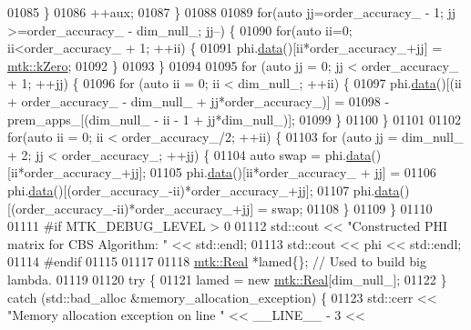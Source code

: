 \begin{DoxyCode}
{{01085       \}
01086       ++aux;
01087     \}
01088 
01089     \textcolor{keywordflow}{for}(\textcolor{keyword}{auto} jj=order\_accuracy\_ - 1; jj >=order\_accuracy\_ - dim\_null\_; jj--) \{
01090       \textcolor{keywordflow}{for}(\textcolor{keyword}{auto} ii=0; ii<order\_accuracy\_ + 1; ++ii) \{
01091         phi.\hyperlink{classmtk_1_1DenseMatrix_a16b3ff56feb2658b9fc7147d1de4d8e7}{data}()[ii*order\_accuracy\_+jj] = \hyperlink{group__c01-roots_ga59a451a5fae30d59649bcda274fea271}{mtk::kZero};
01092       \}
01093     \}
01094 
01095     \textcolor{keywordflow}{for} (\textcolor{keyword}{auto} jj = 0; jj < order\_accuracy\_ + 1; ++jj) \{
01096       \textcolor{keywordflow}{for} (\textcolor{keyword}{auto} ii = 0; ii < dim\_null\_; ++ii) \{
01097         phi.\hyperlink{classmtk_1_1DenseMatrix_a16b3ff56feb2658b9fc7147d1de4d8e7}{data}()[(ii + order\_accuracy\_ - dim\_null\_ + jj*order\_accuracy\_)] =
01098           -prem\_apps\_[(dim\_null\_ - ii - 1 + jj*dim\_null\_)];
01099       \}
01100     \}
01101 
01102     \textcolor{keywordflow}{for}(\textcolor{keyword}{auto} ii = 0; ii < order\_accuracy\_/2; ++ii) \{
01103       \textcolor{keywordflow}{for} (\textcolor{keyword}{auto} jj = dim\_null\_ + 2; jj < order\_accuracy\_; ++jj) \{
01104         \textcolor{keyword}{auto} swap = phi.\hyperlink{classmtk_1_1DenseMatrix_a16b3ff56feb2658b9fc7147d1de4d8e7}{data}()[ii*order\_accuracy\_+jj];
01105         phi.\hyperlink{classmtk_1_1DenseMatrix_a16b3ff56feb2658b9fc7147d1de4d8e7}{data}()[ii*order\_accuracy\_ + jj] =
01106           phi.\hyperlink{classmtk_1_1DenseMatrix_a16b3ff56feb2658b9fc7147d1de4d8e7}{data}()[(order\_accuracy\_-ii)*order\_accuracy\_+jj];
01107         phi.\hyperlink{classmtk_1_1DenseMatrix_a16b3ff56feb2658b9fc7147d1de4d8e7}{data}()[(order\_accuracy\_-ii)*order\_accuracy\_+jj] = swap;
01108       \}
01109     \}
01110 
01111 \textcolor{preprocessor}{    #if MTK\_DEBUG\_LEVEL > 0}
01112     std::cout << \textcolor{stringliteral}{"Constructed PHI matrix for CBS Algorithm: "} << std::endl;
01113     std::cout << phi << std::endl;
01114 \textcolor{preprocessor}{    #endif}
01115 
01117 
01118     \hyperlink{group__c01-roots_gac080bbbf5cbb5502c9f00405f894857d}{mtk::Real} *lamed\{\};  \textcolor{comment}{// Used to build big lambda.}
01119 
01120     \textcolor{keywordflow}{try} \{
01121       lamed = \textcolor{keyword}{new} \hyperlink{group__c01-roots_gac080bbbf5cbb5502c9f00405f894857d}{mtk::Real}[dim\_null\_];
01122     \} \textcolor{keywordflow}{catch} (std::bad\_alloc &memory\_allocation\_exception) \{
01123       std::cerr << \textcolor{stringliteral}{"Memory allocation exception on line "} << \_\_LINE\_\_ - 3 <<
}}
\end{DoxyCode}
